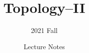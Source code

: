 \documentclass[10pt]{ctexart}
\title{Topology--II}
\author{2021 Fall}
\date{Lecture Notes}
\begin{document}
    \printtitle
    \tableofcontents
    \newpage

	
	
	
	
	
\end{document}
